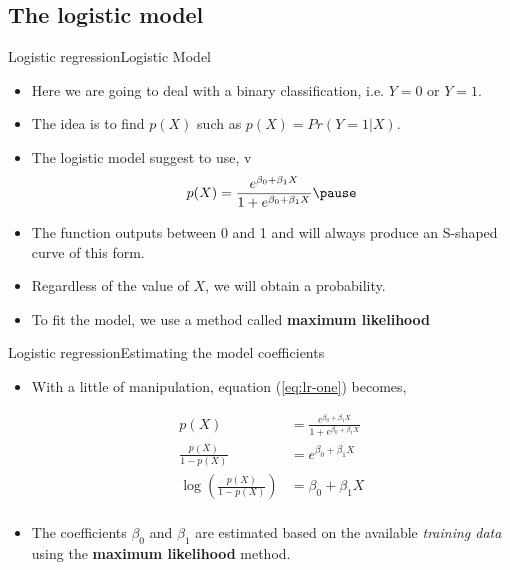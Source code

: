 
\subsection{The logistic model}
\begin{frame}{Logistic regression}{Logistic Model}

\begin{itemize}
    \item Here we are going to deal with a binary classification, i.e. $Y = 0$ or $Y= 1$. \pause 
    \item The idea is to find $p(X)$ such as $p(X) = Pr(Y=1|X)$.  \pause
    \item The logistic model suggest to use, v
        \begin{equation}\label{eq:lr-one}
            p(X) = \frac{e^{\beta_0 + \beta_1 X}}{1 + e^{\beta_0 + \beta_1 X}}  \pause
        \end{equation} \pause 
    \item The function outputs between 0 and 1 and will always produce an S-shaped curve of this form.  \pause
    \item Regardless of the value of $X$, we will obtain a probability.  \pause
    \item To fit the model, we use a method called \textbf{maximum likelihood}
        
\end{itemize}
    
\end{frame}

\begin{frame}{Logistic regression}{Estimating the model coefficients}

\begin{itemize}
    \item With a little of manipulation, equation (\ref{eq:lr-one}) becomes, \pause

    \begin{align*}
        p(X) &= \frac{e^{\beta_0 + \beta_1 X}}{1 + e^{\beta_0 + \beta_1 X}} \\
        \frac{p(X)}{1-p(X)} &= e^{\beta_0 + \beta_1 X} \\
        \log{ \left( \frac{p(X)}{1-p(X)} \right)} &= \beta_0 + \beta_1 X\\ 
    \end{align*} \pause 

    \item The coefficients $\beta_0$ and $\beta_1$ are estimated based on the available \textit{training data} using the \textbf{maximum likelihood} method.
\end{itemize}


\end{frame}

